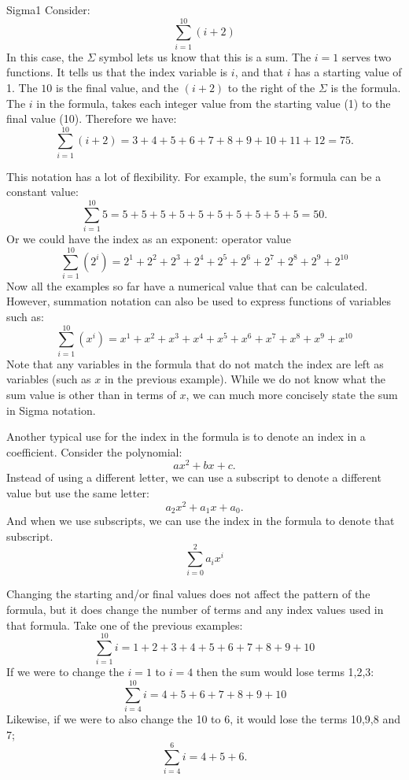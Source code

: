 \begin {example}{Sigma1}
Consider:
\[\sum _{i=1}^{10}(i+2)\]
In this case, the $\Sigma$ symbol lets us know that this is a sum.  The $i=1$ serves two functions.  It tells us that the index variable is $i$, and that $i$ has a starting value of 1. The $10$ is the final value, and the $(i+2)$ to the right of the $\Sigma$ is the formula. The $i$ in the formula, takes each integer value from the starting value (1) to the final value (10).  
Therefore we have:
\[\sum _{i=1}^{10}(i+2) = 3 + 4 + 5 + 6 + 7 + 8 + 9 + 10 + 11 + 12=75.\]
\end {example}

This notation has a lot of flexibility. For example, the sum's formula can be a constant value:
\[\sum _{i=1}^{10}5 = 5 + 5 + 5 + 5 + 5 + 5 + 5 + 5 + 5 + 5 = 50.\]
Or we could have the index as an exponent:
operator value
\[\sum _{i=1}^{10}(2^i) = 2^1 + 2^2 + 2^3 + 2^4 + 2^5 + 2^6+ 2^7+ 2^8+ 2^9+ 2^{10} \]
Now all the examples so far have a numerical value that can be calculated.  However, summation notation can also be used to express functions of variables such as:  
\[\sum _{i=1}^{10}(x^i)= x^1 + x^2 + x^3 + x^4 + x^5 + x^6+ x^7+ x^8+ x^9+ x^{10} \]
Note that any variables in the formula that do not match the index are left as variables (such as $x$ in the previous example).  
While we do not know what the sum value is other than in terms of $x$, we can much more concisely state the sum in Sigma notation.

Another typical use for the index in the formula is to denote an index in a coefficient.  Consider the polynomial:
\[ax^2 + bx + c.\]
Instead of using a different letter, we can use a subscript to denote a different value but use the same letter:
\[a_2x^2 + a_1x + a_0.\]
And when we use subscripts, we can use the index in the formula to denote that subscript.
\[\sum_{i=0}^{2}a_ix^i\]

Changing the starting and/or final values does not affect the pattern of the formula, but it does change the number of terms and any index values used in that formula.  Take one of the previous examples:
\[\sum _{i=1}^{10}i = 1 + 2 + 3 + 4 + 5 + 6 + 7 + 8 + 9 + 10\]
If we were to change the $i=1$ to $i=4$ then the sum would lose terms 1,2,3:
\[\sum _{i=4}^{10}i = 4 + 5 + 6 + 7 + 8 + 9 + 10\]
Likewise, if we were to also change the 10 to 6, it would lose the terms 10,9,8 and 7;
\[\sum _{i=4}^{6}i = 4 + 5 + 6.\]


